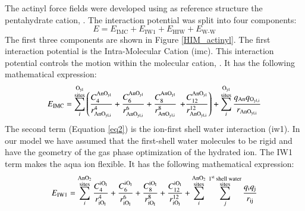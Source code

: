 The actinyl force fields were developed using as reference structure the pentahydrate 
cation, 
. The interaction potential was split into four components:
\begin{equation}
E=E_\text{IMC}+E_\text{IW1}+E_\text{HIW}+E_\text{W-W}
\end{equation}
The first three components are shown in Figure \ref{HIM_actinyl}. The 
first interaction 
potential is the Intra-Molecular Cation (\gls{imc}). This interaction potential controls the motion 
within the molecular cation, . It has the following mathematical expression:
\begin{equation}\label{eq1}
E_{\text{IMC}} = \sum_{i}^{ \substack{\text{O}_{\text{yl}} \vspace{0.02cm}\\ \text{sites} } }\left(
\frac{C_{4}^{\text{AnO}_{\text{yl}   }} }  {r_{\text{AnO}_{\text{yl,i}}}^{4} }  +
\frac{C_{6}^{\text{AnO}_{\text{yl}   }} }  {r_{\text{AnO}_{\text{yl,i}}}^{6} }  +
\frac{C_{8}^{\text{AnO}_{\text{yl}   }} }  {r_{\text{AnO}_{\text{yl,i}}}^{8} }  \right. \left.+
\frac{C_{12}^{\text{AnO}_{\text{yl}   }} }  {r_{\text{AnO}_{\text{yl,i}}}^{12} }\right)  +
\sum_{i}^{\substack{\text{O}_{\text{yl}} \vspace{0.02cm}\\ 
\text{sites} }}
\frac {q_{\text{An}} q_{\text{O}_{\text{yl,i}}}} { r_{\text{AnO}_{\text{yl,i}}} }
\end{equation}
The second term (Equation \ref{eq2}) is the ion-first shell water interaction (\gls{iw1}). In our model 
we have assumed that the first-shell
water molecules to be rigid and have the geometry of the gas phase optimization of the 
hydrated 
ion. 
The IW1 term makes the aqua ion flexible. It has the following mathematical expression:
\begin{equation}\label{eq2}
E_{\text{IW1}} = \sum_{i}^{ \substack{\text{AnO}_{\text 2} \vspace{0.02cm}\\ \text{sites} }}
  \frac {C_{4}^{\text{iO}_{\text I}}}{r_{\text{iO}_{\text I}}^{4}}
+ \frac {C_{6}^{\text{iO}_{\text I}}}{r_{\text{iO}_{\text I}}^{6}}
+ \frac {C_{8}^{\text{iO}_{\text I}}}{r_{\text{iO}_{\text I}}^{8}} 
+ \frac {C_{12}^{\text{iO}_{\text I}}}{r_{\text{iO}_{\text I}}^{12}} 
+ \sum_{i}^{ \substack{\text{AnO}_{\text 2} \vspace{0.02cm}\\ \text{sites} }}\,
\sum_{j}^{ \substack{\text{1}^{\text {st}}\text{ shell water}\vspace{0.02cm}\\ \text{sites} }}
\frac{q_{\text{i}}q_{\text{j}}}{r_{\text{ij}}}\\
\end{equation}
